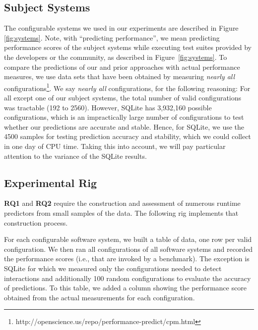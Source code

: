 \documentclass{newsig}
\begin{document}
\subsection{Subject Systems}
\label{sec:subject_systems}
The configurable systems we used in our experiments are described in Figure \ref{fig:systems}.
Note, with ``predicting performance'', we 
mean predicting performance scores of the subject systems while executing test suites provided by the developers or the community, as described in Figure~\ref{fig:systems}.
To compare the predictions of our and prior approaches with actual performance measures, we use data sets that have been obtained by
measuring {\em nearly all} configurations\footnote{http://openscience.us/repo/performance-predict/cpm.html}.
We say {\em nearly all} configurations, for the following reasoning: For 
all except one of our subject systems, the total number of valid configurations
was tractable (192 to 2560). However,  SQLite has 3,932,160 
possible configurations, which is an impractically large number of configurations to test whether our predictions are accurate and stable. Hence, for SQLite, we use the 4500 samples for testing prediction accuracy and stability, which we could collect in one day of CPU time. Taking this into account, we will pay particular attention to the variance of the SQLite results.






\subsection{Experimental Rig}


{\bf RQ1} and {\bf RQ2} require the construction and assessment of numerous runtime predictors from small samples
of the data. The following rig implements that construction process.

For each configurable software system, we built a table of data, one row per valid configuration. We then ran all configurations of all software systems
and recorded the performance scores (i.e., that are invoked by a benchmark).
The exception is SQLite for which we measured only the
configurations needed to detect interactions and additionally
100 random configurations to evaluate the accuracy of
predictions.  
To this table, we added a column showing the performance score obtained from the actual measurements for each configuration.
\end{document}
